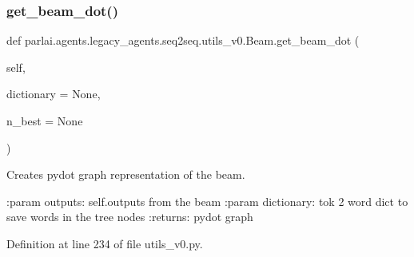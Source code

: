\subsubsection{\texorpdfstring{get\+\_\+beam\+\_\+dot()}{get\_beam\_dot()}}
{\footnotesize\ttfamily def parlai.\+agents.\+legacy\+\_\+agents.\+seq2seq.\+utils\+\_\+v0.\+Beam.\+get\+\_\+beam\+\_\+dot (\begin{DoxyParamCaption}\item[{}]{self,  }\item[{}]{dictionary = {\ttfamily None},  }\item[{}]{n\+\_\+best = {\ttfamily None} }\end{DoxyParamCaption})}

\begin{DoxyVerb}Creates pydot graph representation of the beam.

:param outputs: self.outputs from the beam
:param dictionary: tok 2 word dict to save words in the tree nodes
:returns: pydot graph
\end{DoxyVerb}
 

Definition at line 234 of file utils\+\_\+v0.\+py.



